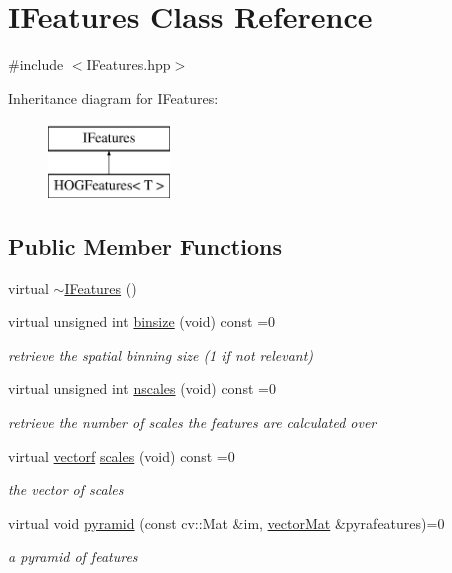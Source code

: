 \hypertarget{classIFeatures}{\section{I\-Features Class Reference}
\label{classIFeatures}
}


{\ttfamily \#include $<$I\-Features.\-hpp$>$}

Inheritance diagram for I\-Features\-:\begin{figure}[H]
\begin{center}
\leavevmode
\includegraphics[height=2.000000cm]{classIFeatures}
\end{center}
\end{figure}
\subsection*{Public Member Functions}
\begin{DoxyCompactItemize}
\item 
virtual \hyperlink{classIFeatures_a7de8c9d6739ebd4504f9d033d71c2f42}{$\sim$\-I\-Features} ()
\item 
virtual unsigned int \hyperlink{classIFeatures_a62dd189aaf441de426fe1661d6306ac4}{binsize} (void) const =0
\begin{DoxyCompactList}\small\item\em retrieve the spatial binning size (1 if not relevant) \end{DoxyCompactList}\item 
virtual unsigned int \hyperlink{classIFeatures_a4d6964609c1c2137e0e14a3ac2f10ebc}{nscales} (void) const =0
\begin{DoxyCompactList}\small\item\em retrieve the number of scales the features are calculated over \end{DoxyCompactList}\item 
virtual \hyperlink{types_8hpp_a4da5db3ee9e284f719ef5764dbadffc8}{vectorf} \hyperlink{classIFeatures_ad02aea9fd29e438d25e1c7d68c508b9e}{scales} (void) const =0
\begin{DoxyCompactList}\small\item\em the vector of scales \end{DoxyCompactList}\item 
virtual void \hyperlink{classIFeatures_a0cd270503671145fae965c8d9fedc91a}{pyramid} (const cv\-::\-Mat \&im, \hyperlink{types_8hpp_a3207a7addcfa415d1c83622febcb1e9b}{vector\-Mat} \&pyrafeatures)=0
\begin{DoxyCompactList}\small\item\em a pyramid of features \end{DoxyCompactList}\end{DoxyCompactItemize}


